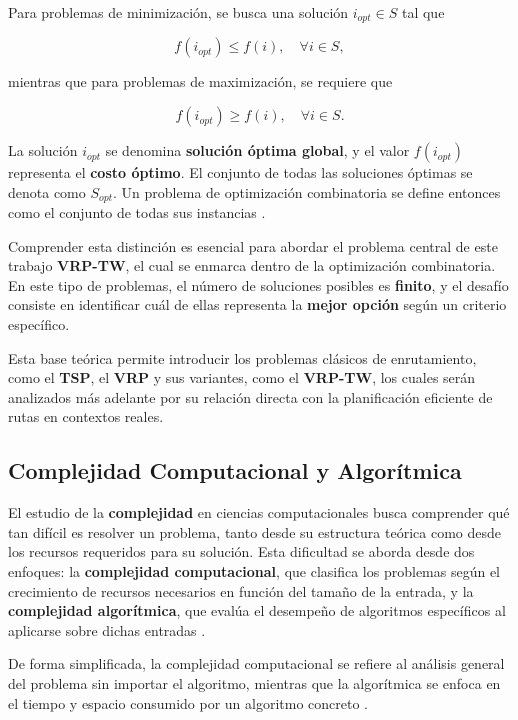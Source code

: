 \documentclass[12pt,titlepage,twoside,openright]{book}
\begin{document}
Para problemas de minimización, se busca una solución \(i_{opt} \in S\) tal que

\[
	f(i_{opt}) \leq f(i), \quad \forall i \in S,
\]

mientras que para problemas de maximización, se requiere que

\[
	f(i_{opt}) \geq f(i), \quad \forall i \in S.
\]

La solución \(i_{opt}\) se denomina \textbf{solución óptima global}, y el valor \(f(i_{opt})\) representa el \textbf{costo óptimo}. El conjunto de todas las soluciones óptimas se denota como \(S_{opt}\). Un problema de optimización combinatoria se define entonces como el conjunto de todas sus instancias \citep{cobos2010}.

Comprender esta distinción es esencial para abordar el problema central de este trabajo \textbf{VRP-TW}, el cual se enmarca dentro de la optimización combinatoria. En este tipo de problemas, el número de soluciones posibles es \textbf{finito}, y el desafío consiste en identificar cuál de ellas representa la \textbf{mejor opción} según un criterio específico.

Esta base teórica permite introducir los problemas clásicos de enrutamiento, como el \textbf{TSP}, el \textbf{VRP} y sus variantes, como el \textbf{VRP-TW}, los cuales serán analizados más adelante por su relación directa con la planificación eficiente de rutas en contextos reales.

\subsection{Complejidad Computacional y Algorítmica}

El estudio de la \textbf{complejidad} en ciencias computacionales busca comprender qué tan difícil es resolver un problema, tanto desde su estructura teórica como desde los recursos requeridos para su solución. Esta dificultad se aborda desde dos enfoques: la \textbf{complejidad computacional}, que clasifica los problemas según el crecimiento de recursos necesarios en función del tamaño de la entrada, y la \textbf{complejidad algorítmica}, que evalúa el desempeño de algoritmos específicos al aplicarse sobre dichas entradas \citep{garey1979computers, papadimitriou1994}.

De forma simplificada, la complejidad computacional se refiere al análisis general del problema sin importar el algoritmo, mientras que la algorítmica se enfoca en el tiempo y espacio consumido por un algoritmo concreto \citep{maldonado2013problema}.
\end{document}
